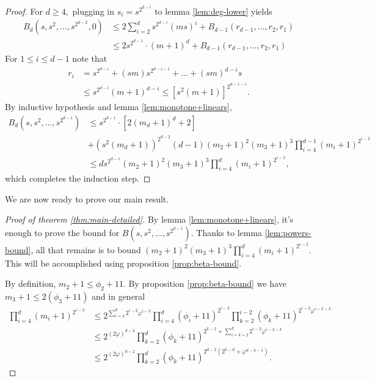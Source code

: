 \documentclass[12pt]{amsart}
\theoremstyle{definition}
\begin{document}
\begin{proof}
    For $d \ge 4,$  plugging in $s_i = s^{2^{d-i}}$ to lemma \ref{lem:deg-lower} yields
    \begin{align*}
        B_d(s,s^2,\ldots,s^{2^{d-2}},0) &\le  2\sum_{i=2}^d s^{2^{d-i}} (ms)^i +  B_{d-1}(r_{d-1},\ldots,r_2,r_1)  \\
    &\le 2s^{2^{d-1}}\cdot (m+1)^d + B_{d-1}(r_{d-1},\ldots,r_2,r_1) 
    \end{align*}
    For $1\le i\le d-1$ note that
    \begin{align*}
        r_i &=  s^{2^{d-i}} + (s m) s^{2^{d-i-1}}+\ldots+(sm)^{d-i} s \\
        &\le s^{2^{d-i}}(m+1)^{d-i} \le [s^2(m+1)]^{2^{d-1-i}}.
    \end{align*}
    By inductive hypothesis and lemma \ref{lem:monotone+linears},
    \begin{align*}
        B_d(s,s^2,\ldots,s^{2^{d-1}}) &\le s^{2^{d-1}}\cdot [2(m_d+1)^d+2] \\
        &+(s^2(m_d+1))^{2^{d-2}} (d-1) (m_2+1)^2(m_3+1)^3 \prod_{i=4}^{d-1} (m_i+1)^{2^{i-2}} \\
        &\le d s^{2^{d-1}} (m_2+1)^2(m_3+1)^3\prod_{i=4}^d (m_i+1)^{2^{i-2}},
    \end{align*}
    which completes the induction step.
\end{proof}

We are now ready to prove our main result.

\begin{proof}[Proof of theorem \ref{thm:main-detailed}]
By lemma \ref{lem:monotone+linears}, it's enough to prove the bound for $B(s,s^2,\ldots,s^{2^{d-1}}).$ Thanks to lemma \ref{lem:powers-bound}, all that remains is to bound $(m_2+1)^2(m_3+1)^3\prod_{i=4}^d (m_i+1)^{2^{i-2}}.$ This will be accomplished using proposition \ref{prop:beta-bound}. 

By definition, $m_2+1 \le \phi_2+11.$ By proposition \ref{prop:beta-bound} we have $m_3+1 \le 2(\phi_3+11)$ and in general 
\begin{align*}
    \prod_{i=4}^d (m_i+1)^{2^{i-2}} &\le 2^{\sum_{i=4}^d 2^{i-2}\varphi^{i-3}} \prod_{i=4}^d (\phi_i+11)^{2^{i-2}} \prod_{k=2}^{i-2} (\phi_k+11)^{2^{i-2}\varphi^{i-2-k}} \\
    &\le 2^{(2\varphi)^{d-2}}  \prod_{k=2}^{d} (\phi_k+11)^{2^{k-2} +\sum_{i=k+2}^d 2^{i-2}\varphi^{i-2-k}} \\
    &\le 2^{(2\varphi)^{d-2}} \prod_{k=2}^d (\phi_k+11)^{2^{d-2}(2^{k-d}+\varphi^{d-k-1})}.
\end{align*}
    
\end{proof}
\end{document}

